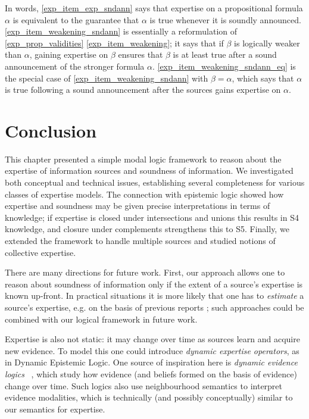 In words, \cref{exp_item_exp_sndann} says that expertise on a propositional
formula $\alpha$ is equivalent to the guarantee that $\alpha$ is true whenever
it is soundly announced. \cref{exp_item_weakening_sndann} is essentially a
reformulation of \cref{exp_prop_validities} \cref{exp_item_weakening}; it says that
if $\beta$ is logically weaker than $\alpha$, gaining expertise on $\beta$
ensures that $\beta$ is at least true after a sound announcement of the
stronger formula $\alpha$.  \cref{exp_item_weakening_sndann_eq} is the special
case of \cref{exp_item_weakening_sndann} with $\beta = \alpha$, which says that
$\alpha$ is true following a sound announcement after the sources gains
expertise on $\alpha$.

\section{Conclusion}
\label{exp_sec_conclusion}

This chapter presented a simple modal logic framework to reason about the
expertise of information sources and soundness of information. We investigated
both conceptual and technical issues, establishing several completeness for
various classes of expertise models. The connection with epistemic logic showed
how expertise and soundness may be given precise interpretations in terms of
knowledge; if expertise is closed under intersections and unions this results
in S4 knowledge, and closure under complements strengthens this to S5. Finally,
we extended the framework to handle multiple sources and studied notions of
collective expertise.

There are many directions for future work.
%
First, our approach allows one to reason about soundness of information
only if the extent of a source's expertise is known up-front. In practical
situations it is more likely that one has to \emph{estimate} a source's
expertise, e.g. on the basis of previous reports
\cite{hunter_building_2021,dastani2004inferring}; such approaches could be
combined with our logical framework in future work.

Expertise is also not static: it may change over time as sources learn and
acquire new evidence. To model this one could introduce \emph{dynamic expertise
operators}, as in Dynamic Epistemic Logic. One
source of inspiration here is \emph{dynamic evidence logics}
~\cite{van2011dynamic,vanbenthem2014106}, which study how evidence (and
beliefs formed on the basis of evidence) change over time. Such logics also use
neighbourhood semantics to interpret evidence modalities, which is technically
(and possibly conceptually) similar to our semantics for expertise.

